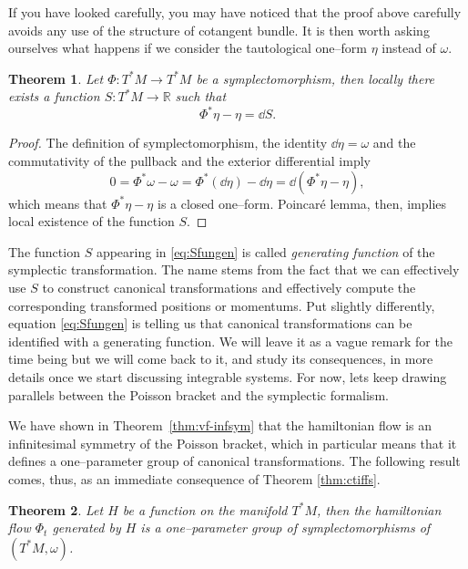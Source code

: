 \documentclass[english,fontsize=11pt,paper=b5]{scrbook}
\numberwithin{equation}{chapter}
\newtheorem{theorem}{Theorem}[chapter]
\theoremstyle{definition}
\begin{document}
    If you have looked carefully, you may have noticed that the proof above carefully avoids any use of the structure of cotangent bundle.
    It is then worth asking ourselves what happens if we consider the tautological one--form $\eta$ instead of $\omega$.

    \begin{theorem}\label{thm:genfun}
      Let $\Phi: T^*M \to T^*M$ be a symplectomorphism, then locally there exists a function $S:T^*M\to\mathbb{R}$ such that
      \begin{equation}\label{eq:Sfungen}
        \Phi^*\eta - \eta = \dd S.
      \end{equation}
    \end{theorem}
    \begin{proof}
      The definition of symplectomorphism, the identity $\dd\eta = \omega$ and the commutativity of the pullback and the exterior differential imply
      \begin{equation}
        0 = \Phi^*\omega - \omega = \Phi^*(\dd\eta) - \dd\eta = \dd(\Phi^*\eta - \eta),
      \end{equation}
      which means that $\Phi^*\eta - \eta$ is a closed one--form.
      Poincar\'e lemma, then, implies local existence of the function $S$.
    \end{proof}

    The function $S$ appearing in \eqref{eq:Sfungen} is called \emph{generating function} of the symplectic transformation.
    The name stems from the fact that we can effectively use $S$ to construct canonical transformations and effectively compute the corresponding transformed positions or momentums.
    Put slightly differently, equation \eqref{eq:Sfungen} is telling us that canonical transformations can be identified with a generating function.
    We will leave it as a vague remark for the time being but we will come back to it, and study its consequences, in more details once we start discussing integrable systems.
    For now, lets keep drawing parallels between the Poisson bracket and the symplectic formalism.

    We have shown in Theorem~\ref{thm:vf-infsym} that the hamiltonian flow is an infinitesimal symmetry of the Poisson bracket, which in particular means that it defines a one--parameter group of canonical transformations.
    The following result comes, thus, as an immediate consequence of Theorem \ref{thm:ctiffs}.

    \begin{theorem}
      Let $H$ be a function on the manifold $T^*M$, then the hamiltonian flow $\Phi_t$ generated by $H$ is a one--parameter group of symplectomorphisms of $(T^*M, \omega)$.
    \end{theorem}
\end{document}
